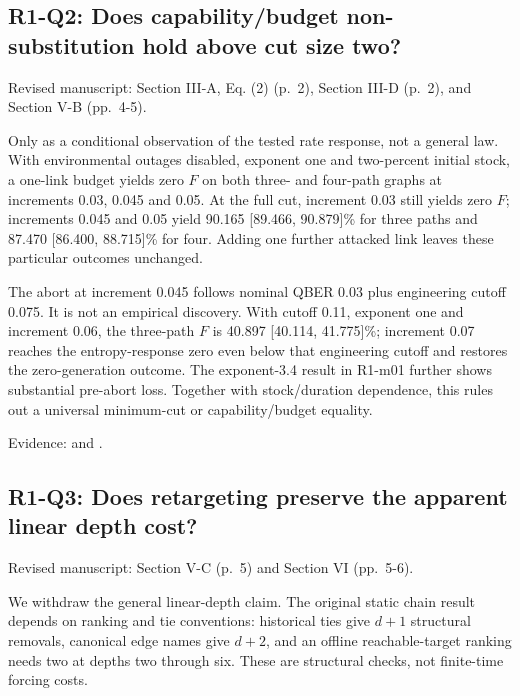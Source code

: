 \documentclass[a4paper,11pt]{article}
\begin{document}
\subsection{R1-Q2: Does capability/budget non-substitution hold above cut size two?}\label{r1-q2-does-capabilitybudget-non-substitution-hold-above-cut-size-two}

Revised manuscript: Section III-A, Eq. (2) (p.~2), Section III-D (p.~2), and Section V-B (pp.~4-5).

Only as a conditional observation of the tested rate response, not a general law. With environmental outages disabled, exponent one and two-percent initial stock, a one-link budget yields zero \(F\) on both three- and four-path graphs at increments 0.03, 0.045 and 0.05. At the full cut, increment 0.03 still yields zero \(F\); increments 0.045 and 0.05 yield 90.165 {[}89.466, 90.879{]}\% for three paths and 87.470 {[}86.400, 88.715{]}\% for four. Adding one further attacked link leaves these particular outcomes unchanged.

The abort at increment 0.045 follows nominal QBER 0.03 plus engineering cutoff 0.075. It is not an empirical discovery. With cutoff 0.11, exponent one and increment 0.06, the three-path \(F\) is 40.897 {[}40.114, 41.775{]}\%; increment 0.07 reaches the entropy-response zero even below that engineering cutoff and restores the zero-generation outcome. The exponent-3.4 result in R1-m01 further shows substantial pre-abort loss. Together with stock/duration dependence, this rules out a universal minimum-cut or capability/budget equality.

Evidence:  and .

\subsection{R1-Q3: Does retargeting preserve the apparent linear depth cost?}\label{r1-q3-does-retargeting-preserve-the-apparent-linear-depth-cost}

Revised manuscript: Section V-C (p.~5) and Section VI (pp.~5-6).

We withdraw the general linear-depth claim. The original static chain result depends on ranking and tie conventions: historical ties give \(d+1\) structural removals, canonical edge names give \(d+2\), and an offline reachable-target ranking needs two at depths two through six. These are structural checks, not finite-time forcing costs.
\end{document}
